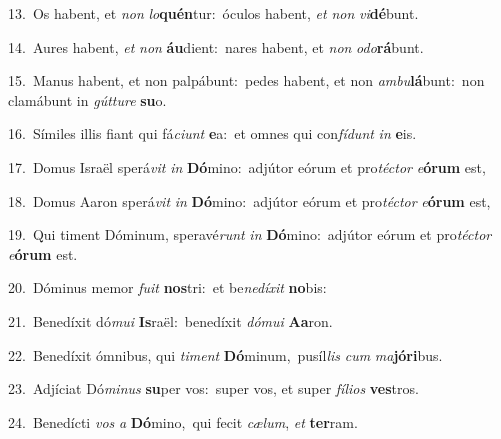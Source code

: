 {\numbfont\textcolor{\numbcolor}{13.}}~Os habent, et \textit{non} \textit{lo}\-\textbf{quén}tur:~\star óculos habent, \textit{et} \textit{non} \textit{vi}\-\textbf{dé}bunt.\par
{\numbfont\textcolor{\numbcolor}{14.}}~Aures habent, \textit{et} \textit{non} \textbf{áu}\-dient:~\star nares habent, et \textit{non} \textit{o}\-\textit{do}\textbf{rá}bunt.\par
{\numbfont\textcolor{\numbcolor}{15.}}~Manus habent, et non palpábunt:~\dagger pedes habent, et non \textit{am}\-\textit{bu}\textbf{lá}bunt:~\star non clamábunt in \textit{gút}\-\textit{tu}\textit{re} \textbf{su}\-o.\par
{\numbfont\textcolor{\numbcolor}{16.}}~Símiles illis fiant qui fá\-\textit{ci}\-\textit{unt} \textbf{e}\-a:~\star et omnes qui con\-\textit{fí}\-\textit{dunt} \textit{in} \textbf{e}\-is.\par
{\numbfont\textcolor{\numbcolor}{17.}}~Domus Israël sperá\textit{vit} \textit{in} \textbf{Dó}\-mino:~\star adjútor eórum et pro\-\textit{téc}\-\textit{tor} \textit{e}\-\textbf{ó}\textbf{rum} est,\par
{\numbfont\textcolor{\numbcolor}{18.}}~Domus Aaron sperá\textit{vit} \textit{in} \textbf{Dó}\-mino:~\star adjútor eórum et pro\-\textit{téc}\-\textit{tor} \textit{e}\-\textbf{ó}\textbf{rum} est,\par
{\numbfont\textcolor{\numbcolor}{19.}}~Qui timent Dóminum, speravé\textit{runt} \textit{in} \textbf{Dó}\-mino:~\star adjútor eórum et pro\-\textit{téc}\-\textit{tor} \textit{e}\-\textbf{ó}\textbf{rum} est.\par
{\numbfont\textcolor{\numbcolor}{20.}}~Dóminus memor \textit{fu}\-\textit{it} \textbf{nos}\-tri:~\star et be\-\textit{ne}\-\textit{dí}\textit{xit} \textbf{no}\-bis:\par
{\numbfont\textcolor{\numbcolor}{21.}}~Benedíxit dó\-\textit{mu}\-\textit{i} \textbf{Is}\-raël:~\star benedíxit \textit{dó}\-\textit{mu}\textit{i} \textbf{A}\-\textbf{a}ron.\par
{\numbfont\textcolor{\numbcolor}{22.}}~Benedíxit ómnibus, qui \textit{ti}\-\textit{ment} \textbf{Dó}\-minum,~\star pusíl\textit{lis} \textit{cum} \textit{ma}\-\textbf{jó}\textbf{ri}bus.\par
{\numbfont\textcolor{\numbcolor}{23.}}~Adjíciat Dó\-\textit{mi}\-\textit{nus} \textbf{su}\-per vos:~\star super vos, et super \textit{fí}\-\textit{li}\textit{os} \textbf{ves}\-tros.\par
{\numbfont\textcolor{\numbcolor}{24.}}~Benedícti \textit{vos} \textit{a} \textbf{Dó}\-mino,~\star qui fecit \textit{cæ}\-\textit{lum}, \textit{et} \textbf{ter}\-ram.\par
